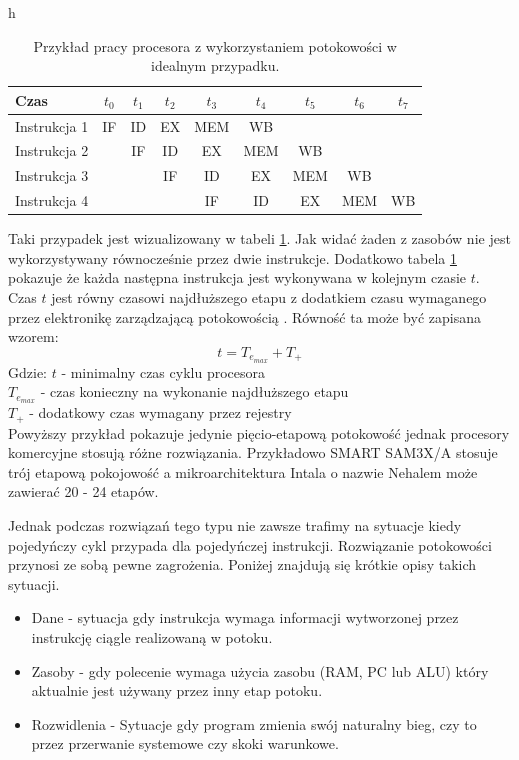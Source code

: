 \documentclass[a4paper,12pt]{article}
\begin{document}
\begin{table}{h}
        \centering
        \caption{Przykład pracy procesora z wykorzystaniem potokowości w idealnym przypadku.}
        \label{pipelining}
        \begin{tabular}{lcccccccc}
                Czas & $t_0$&$t_1$&$t_2$&$t_3$&$t_4$&$t_5$&$t_6$&$t_7$ \\ \hline
                Instrukcja 1 & IF & ID & EX & MEM & WB &    & \\
                Instrukcja 2 &    & IF & ID & EX & MEM & WB & \\
                Instrukcja 3 &    &    & IF & ID & EX & MEM & WB \\
                Instrukcja 4 &    &    &    & IF & ID & EX & MEM & WB
        \end{tabular}
\end{table}


Taki przypadek jest wizualizowany w tabeli \ref{pipelining}. Jak widać żaden z zasobów nie jest wykorzystywany równocześnie przez dwie instrukcje.
Dodatkowo tabela \ref{pipelining} pokazuje że każda następna instrukcja jest wykonywana w kolejnym czasie $t$. 
Czas $t$ jest równy czasowi najdłuższego etapu z dodatkiem czasu wymaganego przez elektronikę zarządzającą potokowością \cite{arch}.
Równość ta może być zapisana wzorem:
\begin{equation}
        t = T_{e_{max}} + T_{+}
\end{equation}
Gdzie:
        $t$ - minimalny czas cyklu procesora \\
        $T_{e_{max}}$ - czas konieczny na wykonanie najdłuższego etapu \\
        $T_{+}$ - dodatkowy czas wymagany przez rejestry \\


Powyższy przykład pokazuje jedynie pięcio-etapową potokowość jednak procesory komercyjne stosują różne rozwiązania. Przykładowo SMART SAM3X/A stosuje trój etapową pokojowość\cite{datasheet} a mikroarchitektura Intala o nazwie Nehalem może zawierać 20 - 24 etapów\cite{pipelining intel}.

Jednak podczas rozwiązań tego typu nie zawsze trafimy na sytuacje kiedy pojedyńczy cykl przypada dla pojedyńczej instrukcji. 
Rozwiązanie potokowości przynosi ze sobą pewne zagrożenia. Poniżej znajdują się krótkie opisy takich sytuacji. 

\begin{itemize}
        \item Dane - sytuacja gdy instrukcja wymaga informacji wytworzonej przez instrukcję ciągle realizowaną w potoku. 
        \item Zasoby - gdy polecenie wymaga użycia zasobu (RAM, PC lub ALU) który aktualnie jest używany przez inny etap potoku. 
        \item Rozwidlenia - Sytuacje gdy program zmienia swój naturalny bieg, czy to przez przerwanie systemowe czy skoki warunkowe. 
\end{itemize}
\end{document}
